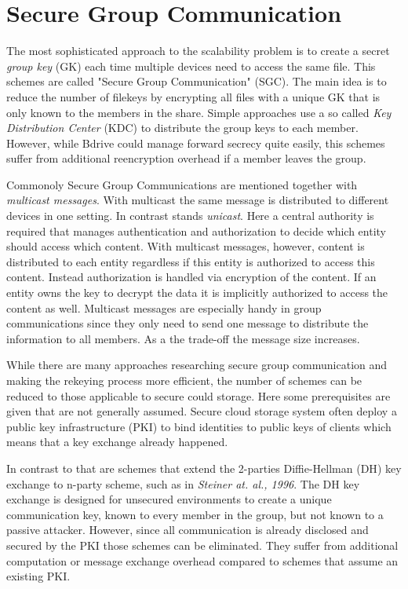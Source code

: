 \section{Secure Group Communication}
The most sophisticated approach to the scalability problem is to create a secret \textit{group key} (\ac{GK}) each time multiple devices need to access the same file. This schemes are called "Secure Group Communication" (\ac{SGC}). The main idea is to reduce the number of filekeys by encrypting all files with a unique \ac{GK} that is only known to the members in the share. Simple approaches use a so called \textit{Key Distribution Center} (\ac{KDC}) to distribute the group keys to each member. However, while Bdrive could manage forward secrecy quite easily, this schemes suffer from additional reencryption overhead if a member leaves the group. 

Commonoly Secure Group Communications are mentioned together with \textit{multicast messages}. With multicast the same message is distributed to different devices in one setting. In contrast stands \textit{unicast}. Here a central authority is required that manages authentication and authorization to decide which entity should access which content. With multicast messages, however, content is distributed to each entity regardless if this entity is authorized to access this content. Instead authorization is handled via encryption of the content. If an entity owns the key to decrypt the data it is implicitly authorized to access the content as well. Multicast messages are especially handy in group communications since they only need to send one message to distribute the information to all members. As a the trade-off the message size increases.

While there are many approaches researching secure group communication and making the rekeying process more efficient, the number of schemes can be reduced to those applicable to secure could storage. Here some prerequisites are given that are not generally assumed. Secure cloud storage system often deploy a public key infrastructure (\ac{PKI}) to bind identities to public keys of clients which means that a key exchange already happened.

In contrast to that are schemes that extend the 2-parties Diffie-Hellman (\ac{DH}) key exchange to n-party scheme, such as in \textit{Steiner at. al., 1996}\cite{steiner1996diffie}. The \ac{DH} key exchange is designed for unsecured environments to create a unique communication key, known to every member in the group, but not known to a passive attacker. However, since all communication is already disclosed and secured by the \ac{PKI} those schemes can be eliminated. They suffer from additional computation or message exchange overhead compared to schemes that assume an existing \ac{PKI}.   

